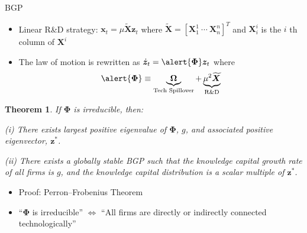 \documentclass[
  10pt,               %
  aspectratio=169,     %
]{beamer}
\theoremstyle{plain}
\newtheorem*{thm*}{Theorem}
\begin{document}
\begin{frame}{BGP}
  \begin{itemize}
    \label{bgp}
    \item Linear R\&D strategy: $\bm{x}_{t}=\mu\bm{\widetilde{X}}\bm{z}_{t}$ where $\bm{\widetilde{X}}= \left[\bm{X}_{1}^{1} \ \cdots \ \bm{X}_{n}^{n}\right]^{T}$ and $\bm{X}_{i}^{i}$ is the $i$ th column of $\bm{X}^{i}$
    \item The law of motion is rewritten as $\dot{\bm{z}}_{t}=\alert{\bm{\Phi}}\bm{z}_{t}$
          where
          \[
            \alert{\bm{\Phi}}\equiv\underbrace{\bm{\Omega}}_{\text{Tech Spillover}}+\underbrace{\mu^{2}\bm{\widetilde{X}}}_{\text{R\&D}}
          \]
          \vspace{-7mm}
  \end{itemize}\pause
  \begin{thm*}
    If \alert{$\bm{\Phi}$} is irreducible, then:

    (i) There exists largest positive eigenvalue of \alert{$\bm{\Phi}$}, $g$, and
    associated positive eigenvector, $\bm{z}^{*}$.

    (ii) There exists a globally stable BGP such that the knowledge capital
    growth rate of all firms is $g$, and the knowledge capital distribution
    is a scalar multiple of $\bm{z}^{*}$.
  \end{thm*}
  \begin{itemize}
    \item Proof: Perron--Frobenius Theorem
    \item ``\alert{$\bm{\Phi}$} is irreducible'' $\Longleftrightarrow$ ``All firms are
          directly or indirectly connected technologically''
  \end{itemize}
  \hyperlink{symmetric}{}
\end{frame}
\end{document}
